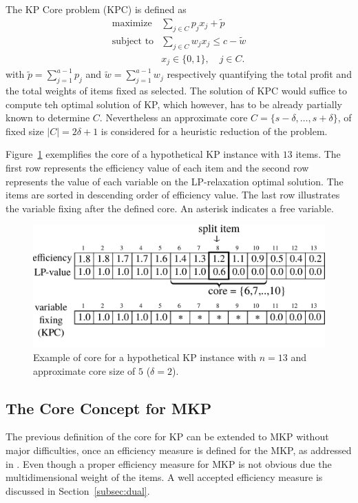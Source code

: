 The KP Core problem (KPC) is defined as
\begin{align*}
  \text{maximize} & \sum_{j \in C} p_j x_j  + \tilde{p}\\
  \text{subject to} & \sum_{j \in C} w_{j} x_j \leqslant c - \tilde{w}\\
  & x_j \in \{0, 1\}, \quad j \in C.
\end{align*}
with $\tilde{p} = \sum^{a-1}_{j=1} p_j$ and $\tilde{w} = \sum^{a-1}_{j=1} w_j$
respectively quantifying the total profit and the total weights of items fixed as selected.
The solution of KPC would suffice to compute teh optimal solution of KP, which
however, has to be already partially known to determine $C$.
Nevertheless an approximate core $C = \{s-\delta, \ldots, s+\delta\}$,
of fixed size $|C| = 2\delta+1$ is considered for a heuristic reduction of the problem.

Figure~\ref{fig:kpcore} exemplifies the core of a hypothetical KP instance with
$13$ items.
The first row represents the efficiency value of each item and the second row
represents the value of each variable on the LP-relaxation optimal solution.
The items are sorted in descending order of efficiency value.
The last row illustrates the variable fixing after the defined core.
An asterisk indicates a free variable.

\begin{figure}[h]
  \centering
  \includegraphics[scale=0.406]{imgs/kp_3}
  \caption{Example of core for a hypothetical KP instance with $n=13$ and approximate core size of $5$ ($\delta = 2$).}
  \label{fig:kpcore}
\end{figure}

\subsection{The Core Concept for MKP}

The previous definition of the core for KP can be extended to MKP without major
difficulties, once an efficiency measure is defined for the MKP,
as addressed in \cite{puchinger2006core}.
Even though a proper efficiency measure for MKP is not obvious due the
multidimensional weight of the items.
A well accepted efficiency measure is discussed in Section~\ref{subsec:dual}.

